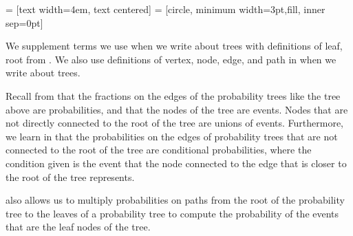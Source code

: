\documentclass[a4paper,11pt]{article}
\begin{document}
 = [text width=4em, text centered]
 = [circle, minimum width=3pt,fill, inner sep=0pt]

\begin{center}
\end{center}

We supplement terms we use when we write about trees with definitions 
of leaf, root from \cite{treeSlides}.  We also use definitions of 
vertex, node, edge, and path in \cite{graphSlides} when we write about
trees.

Recall from \cite{reading3} that the fractions on the edges of the
probability trees like the tree above are probabilities, and that the
nodes of the tree are events.  Nodes that are not directly connected to 
the root of the tree are unions of events.  Furthermore,  we learn in 
\cite{reading3} that the probabilities on the edges of probability trees 
that are not connected to the root of the tree are conditional 
probabilities, where the condition given is  the event that the node 
connected to the edge that is closer to the root of the tree represents. 

\cite{reading3} also allows us to multiply probabilities on paths from
the root of the probability tree to the leaves of a probability tree
to compute the probability of the events that are the leaf nodes of the
tree.
\end{document}
